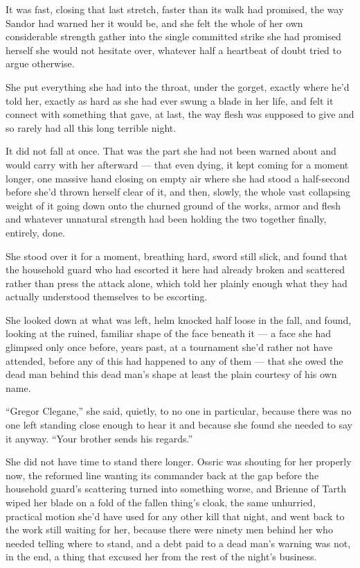 It was fast, closing that last stretch, faster than its walk had promised, the way Sandor had warned her it would be, and she felt the whole of her own considerable strength gather into the single committed strike she had promised herself she would not hesitate over, whatever half a heartbeat of doubt tried to argue otherwise.

She put everything she had into the throat, under the gorget, exactly where he’d told her, exactly as hard as she had ever swung a blade in her life, and felt it connect with something that gave, at last, the way flesh was supposed to give and so rarely had all this long terrible night.

\sceneBreak

It did not fall at once. That was the part she had not been warned about and would carry with her afterward — that even dying, it kept coming for a moment longer, one massive hand closing on empty air where she had stood a half-second before she’d thrown herself clear of it, and then, slowly, the whole vast collapsing weight of it going down onto the churned ground of the works, armor and flesh and whatever unnatural strength had been holding the two together finally, entirely, done.

She stood over it for a moment, breathing hard, sword still slick, and found that the household guard who had escorted it here had already broken and scattered rather than press the attack alone, which told her plainly enough what they had actually understood themselves to be escorting.

She looked down at what was left, helm knocked half loose in the fall, and found, looking at the ruined, familiar shape of the face beneath it — a face she had glimpsed only once before, years past, at a tournament she’d rather not have attended, before any of this had happened to any of them — that she owed the dead man behind this dead man’s shape at least the plain courtesy of his own name.

“Gregor Clegane,” she said, quietly, to no one in particular, because there was no one left standing close enough to hear it and because she found she needed to say it anyway. “Your brother sends his regards.”

\sceneBreak

She did not have time to stand there longer. Ossric was shouting for her properly now, the reformed line wanting its commander back at the gap before the household guard’s scattering turned into something worse, and Brienne of Tarth wiped her blade on a fold of the fallen thing’s cloak, the same unhurried, practical motion she’d have used for any other kill that night, and went back to the work still waiting for her, because there were ninety men behind her who needed telling where to stand, and a debt paid to a dead man’s warning was not, in the end, a thing that excused her from the rest of the night’s business.

